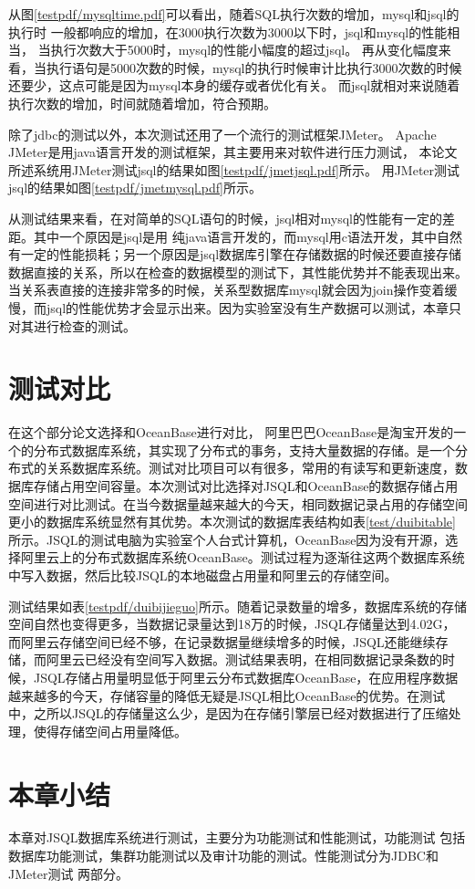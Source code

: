

从图\ref{testpdf/mysqltime.pdf}可以看出，随着SQL执行次数的增加，mysql和jsql的执行时
一般都响应的增加，在3000执行次数为3000以下时，jsql和mysql的性能相当，
当执行次数大于5000时，mysql的性能小幅度的超过jsql。
再从变化幅度来看，当执行语句是5000次数的时候，mysql的执行时候审计比执行3000次数的时候
还要少，这点可能是因为mysql本身的缓存或者优化有关。
而jsql就相对来说随着执行次数的增加，时间就随着增加，符合预期。

除了jdbc的测试以外，本次测试还用了一个流行的测试框架JMeter。
Apache JMeter是用java语言开发的测试框架，其主要用来对软件进行压力测试，
   本论文所述系统用JMeter测试jsql的结果如图\ref{testpdf/jmetjsql.pdf}所示。
    用JMeter测试jsql的结果如图\ref{testpdf/jmetmysql.pdf}所示。
   
   从测试结果来看，在对简单的SQL语句的时候，jsql相对mysql的性能有一定的差距。其中一个原因是jsql是用
   纯java语言开发的，而mysql用c语法开发，其中自然有一定的性能损耗；另一个原因是jsql数据库引擎在存储数据的时候还要直接存储数据直接的关系，所以在检查的数据模型的测试下，其性能优势并不能表现出来。当关系表直接的连接非常多的时候，关系型数据库mysql就会因为join操作变着缓慢，而jsql的性能优势才会显示出来。因为实验室没有生产数据可以测试，本章只对其进行检查的测试。
\section{测试对比}
在这个部分论文选择和OceanBase进行对比，
阿里巴巴OceanBase是淘宝开发的一个的分布式数据库系统，其实现了分布式的事务，支持大量数据的存储。是一个分布式的关系数据库系统。测试对比项目可以有很多，常用的有读写和更新速度，数据库存储占用空间容量。本次测试对比选择对JSQL和OceanBase的数据存储占用空间进行对比测试。在当今数据量越来越大的今天，相同数据记录占用的存储空间更小的数据库系统显然有其优势。本次测试的数据库表结构如表\ref{test/duibitable}所示。JSQL的测试电脑为实验室个人台式计算机，OceanBase因为没有开源，选择阿里云上的分布式数据库系统OceanBase。测试过程为逐渐往这两个数据库系统中写入数据，然后比较JSQL的本地磁盘占用量和阿里云的存储空间。

测试结果如表\ref{testpdf/duibijieguo}所示。随着记录数量的增多，数据库系统的存储空间自然也变得更多，当数据记录量达到18万的时候，JSQL存储量达到4.02G，而阿里云存储空间已经不够，在记录数据量继续增多的时候，JSQL还能继续存储，而阿里云已经没有空间写入数据。测试结果表明，在相同数据记录条数的时候，JSQL存储占用量明显低于阿里云分布式数据库OceanBase，在应用程序数据越来越多的今天，存储容量的降低无疑是JSQL相比OceanBase的优势。在测试中，之所以JSQL的存储量这么少，是因为在存储引擎层已经对数据进行了压缩处理，使得存储空间占用量降低。
\section{本章小结}
本章对JSQL数据库系统进行测试，主要分为功能测试和性能测试，功能测试
包括数据库功能测试，集群功能测试以及审计功能的测试。性能测试分为JDBC和JMeter测试
两部分。